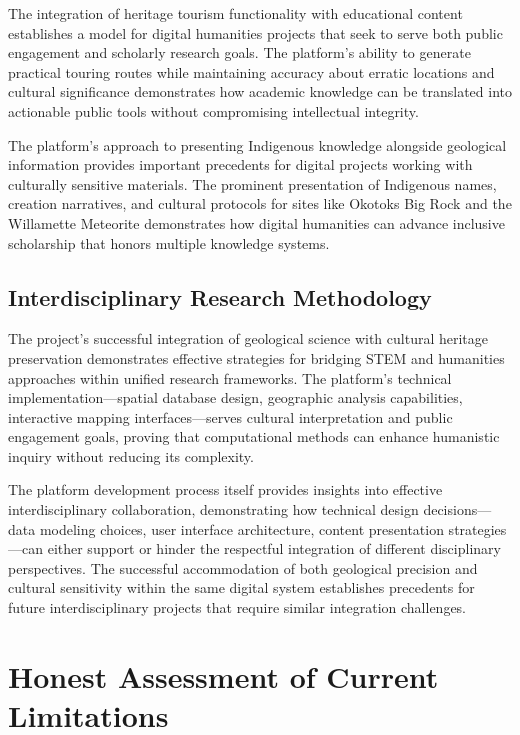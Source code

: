 The integration of heritage tourism functionality with educational content establishes a model for digital humanities projects that seek to serve both public engagement and scholarly research goals. The platform's ability to generate practical touring routes while maintaining accuracy about erratic locations and cultural significance demonstrates how academic knowledge can be translated into actionable public tools without compromising intellectual integrity.

The platform's approach to presenting Indigenous knowledge alongside geological information provides important precedents for digital projects working with culturally sensitive materials. The prominent presentation of Indigenous names, creation narratives, and cultural protocols for sites like Okotoks Big Rock and the Willamette Meteorite demonstrates how digital humanities can advance inclusive scholarship that honors multiple knowledge systems.

\subsection{Interdisciplinary Research Methodology}
\label{subsec:interdisciplinary_methodology}

The project's successful integration of geological science with cultural heritage preservation demonstrates effective strategies for bridging STEM and humanities approaches within unified research frameworks. The platform's technical implementation—spatial database design, geographic analysis capabilities, interactive mapping interfaces—serves cultural interpretation and public engagement goals, proving that computational methods can enhance humanistic inquiry without reducing its complexity.

The platform development process itself provides insights into effective interdisciplinary collaboration, demonstrating how technical design decisions—data modeling choices, user interface architecture, content presentation strategies—can either support or hinder the respectful integration of different disciplinary perspectives. The successful accommodation of both geological precision and cultural sensitivity within the same digital system establishes precedents for future interdisciplinary projects that require similar integration challenges.

\section{Honest Assessment of Current Limitations}
\label{sec:limitations_assessment}

